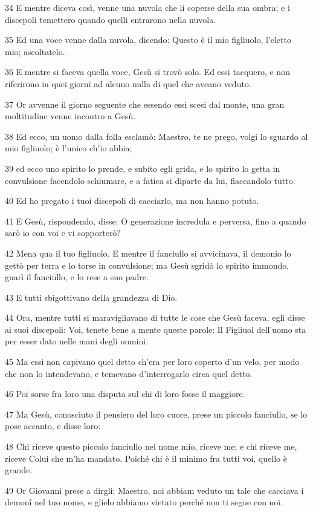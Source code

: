 \par 34 E mentre diceva così, venne una nuvola che li coperse della sua ombra; e i discepoli temettero quando quelli entrarono nella nuvola.
\par 35 Ed una voce venne dalla nuvola, dicendo: Questo è il mio figliuolo, l'eletto mio; ascoltatelo.
\par 36 E mentre si faceva quella voce, Gesù si trovò solo. Ed essi tacquero, e non riferirono in quei giorni ad alcuno nulla di quel che aveano veduto.
\par 37 Or avvenne il giorno seguente che essendo essi scesi dal monte, una gran moltitudine venne incontro a Gesù.
\par 38 Ed ecco, un uomo dalla folla esclamò: Maestro, te ne prego, volgi lo sguardo al mio figliuolo; è l'unico ch'io abbia;
\par 39 ed ecco uno spirito lo prende, e subito egli grida, e lo spirito lo getta in convulsione facendolo schiumare, e a fatica si diparte da lui, fiaccandolo tutto.
\par 40 Ed ho pregato i tuoi discepoli di cacciarlo, ma non hanno potuto.
\par 41 E Gesù, rispondendo, disse: O generazione incredula e perversa, fino a quando sarò io con voi e vi sopporterò?
\par 42 Mena qua il tuo figliuolo. E mentre il fanciullo si avvicinava, il demonio lo gettò per terra e lo torse in convulsione; ma Gesù sgridò lo spirito immondo, guarì il fanciullo, e lo rese a suo padre.
\par 43 E tutti sbigottivano della grandezza di Dio.
\par 44 Ora, mentre tutti si maravigliavano di tutte le cose che Gesù faceva, egli disse ai suoi discepoli: Voi, tenete bene a mente queste parole: Il Figliuol dell'uomo sta per esser dato nelle mani degli uomini.
\par 45 Ma essi non capivano quel detto ch'era per loro coperto d'un velo, per modo che non lo intendevano, e temevano d'interrogarlo circa quel detto.
\par 46 Poi sorse fra loro una disputa sul chi di loro fosse il maggiore.
\par 47 Ma Gesù, conosciuto il pensiero del loro cuore, prese un piccolo fanciullo, se lo pose accanto, e disse loro:
\par 48 Chi riceve questo piccolo fanciullo nel nome mio, riceve me; e chi riceve me, riceve Colui che m'ha mandato. Poiché chi è il minimo fra tutti voi, quello è grande.
\par 49 Or Giovanni prese a dirgli: Maestro, noi abbiam veduto un tale che cacciava i demonî nel tuo nome, e glielo abbiamo vietato perché non ti segue con noi.

